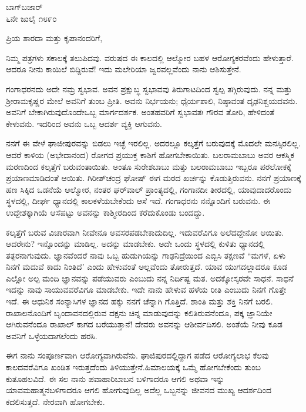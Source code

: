 \vspace{-0.65cm}

\begin{flushright}
ಬಾಗ್‌ಬಜಾರ್\\ ೬ನೇ ಜುಲೈ ೧೮೯೦
\end{flushright}

\noindent
ಪ್ರಿಯ ಶಾರದಾ ಮತ್ತು ಕೃಪಾನಂದರಿಗೆ,

ನಿಮ್ಮ ಪತ್ರಗಳು ಸಕಾಲಕ್ಕೆ ತಲುಪಿದವು. ವರುಷದ ಈ ಕಾಲದಲ್ಲಿ ಆಲ್ಮೋರ ಬಹಳ ಆರೋಗ್ಯಕರವೆಂದು ಹೇಳುತ್ತಾರೆ. ಆದರೂ ನೀನು ಕಾಯಿಲೆ ಬಿದ್ದಿರುವೆ! ಇದು ಮಲೇರಿಯಾ ಜ್ವರವಲ್ಲವೆಂದು ನಾನು ಆಶಿಸುತ್ತೇನೆ.

ಗಂಗಾಧರನದು ಅದೇ ನಮ್ರ ಸ್ವಭಾವ. ಅವನ ಪ್ರಕ್ಷುಬ್ಧ ಸ್ವಭಾವವು ತಿರುಗಾಟದಿಂದ ಸ್ವಲ್ಪ ತಗ್ಗಿರುವುದು. ನನ್ನ ಮತ್ತು ಶ‍್ರೀರಾಮಕೃಷ್ಣರ ಮೇಲೆ ಅವನಿಗೆ ತುಂಬ ಪ್ರೀತಿ. ಅವನು ನಿರ್ಭಯನು; ಧೈರ್ಯಶಾಲಿ, ನಿಷ್ಠಾವಂತ ದೃಢನಿಶ್ಚಯದವನು. ಅವನಿಗೆ ಬೇಕಾಗಿರುವುದೊಂದೇ\enginline{-}ಒಬ್ಬ ಮಾರ್ಗದರ್ಶಕ. ಅಂತಹವರಿಗೆ ಸ್ವಭಾವತಃ ಗೌರವ ತೋರಿ, ಹೇಳಿದಂತೆ ಕೇಳುವನು. ಇದರಿಂದ ಅವನು ಒಬ್ಬ ಆದರ್ಶ ವ್ಯಕ್ತಿ ಆಗುವನು.

ನನಗೆ ಈ ವೇಳೆ ಘಾಜೀಪುರವನ್ನು ಬಿಡಲು ಇಚ್ಛೆ ಇರಲಿಲ್ಲ. ಅದರಲ್ಲೂ ಕಲ್ಕತ್ತೆಗೆ ಬರುವುದಕ್ಕೆ ಮೊದಲೇ ಮನಸ್ಸಿರಲಿಲ್ಲ. ಆದರೆ ಕಾಳಿಯ (ಅಭೇದಾನಂದ) ರೋಗದ ಪ್ರಯುಕ್ತ ಕಾಶಿಗೆ ಹೋಗಬೇಕಾಯಿತು. ಬಲರಾಮಬಾಬು ಅವರ ಆಕಸ್ಮಿಕ ಮರಣದಿಂದ ಕಲ್ಕತ್ತೆಗೆ ಬರುವಂತಾಯಿತು. ಅಂತೂ ಸುರೇಶಬಾಬು ಮತ್ತು ಬಲರಾಮಬಾಬು ಇಬ್ಬರೂ ಪರಲೋಕಕ್ಕೆ ಪ್ರಯಾಣಮಾಡಿದಂತೆ ಆಯಿತು. ಗಿರೀಶ್‌ಚಂದ್ರ ಘೋಷ್ ಈಗ ಮಠದ ಖರ್ಚನ್ನು ಕೊಡುತ್ತಿರುವನು. ನನಗೆ ಪ್ರಯಾಣಕ್ಕೆ ಹಣ ಸಿಕ್ಕಿದ ಒಡನೆಯೆ ಆಲ್ಮೋರ, ನಂತರ ಘರ್‌ವಾಲ್ ಪ್ರಾಂತ್ಯದಲ್ಲಿ, ಗಂಗಾನದೀ ತೀರದಲ್ಲಿ, ಯಾವುದಾದರೊಂದು ಸ್ಥಳದಲ್ಲಿ, ದೀರ್ಘ ಧ್ಯಾನದಲ್ಲಿ ಕಾಲಕಳೆಯಬೇಕೆಂದು ಆಸೆ ಇದೆ. ಗಂಗಾಧರನು ನನ್ನೊಂದಿಗೆ ಬರುವನು. ಈ ಉದ್ದೇಶಕ್ಕಾಗಿಯೆ ಆಸೆಪಟ್ಟು ಅವನನ್ನು ಕಾಶ್ಮೀರದಿಂದ ಕರೆದುಕೊಂಡು ಬಂದದ್ದು.

ಕಲ್ಕತ್ತೆಗೆ ಬರುವ ವಿಚಾರವಾಗಿ ನೀವೇನೂ ಅವಸರಪಡಬೇಕಾದುದಿಲ್ಲ. ಇದುವರೆವಿಗೂ ಅಲೆದದ್ದೇನೋ ಆಯಿತು. ಆದರೇನು? ಇನ್ನೊಂದನ್ನು ಮಾಡಿಲ್ಲ. ಅದನ್ನು ಮಾಡಬೇಕು. ಅದೇ ಒಂದು ಸ್ಥಳದಲ್ಲಿ ಕುಳಿತು ಧ್ಯಾನದಲ್ಲಿ ತತ್ಪರನಾಗುವುದು. ಜ್ಞಾನವೆಂದರೆ ನಾವು ಒಬ್ಬ ಹುಡುಗಿಯನ್ನು ಗಾಢನಿದ್ರೆಯಿಂದ ಎಬ್ಬಿಸಿ ತಕ್ಷಣವೆ ``ಮಗಳೆ, ಏಳು ನಿನಗೆ ಮದುವೆ ಕಾದು ನಿಂತಿದೆ' ಎಂದು ಹೇಳುವಂತೆ ಅಲ್ಲವೆಂದು ತೋರುತ್ತದೆ. ಯಾವ ಯುಗದಲ್ಲಾದರೂ ಕೂಡ ಎಲ್ಲೋ ಅಲ್ಪ ಮಂದಿ ಜ್ಞಾನವನ್ನು ಪಡೆಯುವರು ಎಂಬುದು ನನ್ನ ನಿರ್ದಿಷ್ಟ ಮತ. ಅದಕ್ಕೋಸ್ಕರವೇ ಸಾಧನೆ. ಸಾಧನೆ \enginline{-} ಇದನ್ನು ನಾವು ಸಾಯುವವರೆವಿಗೂ ಮಾಡಬೇಕು. ಇದೇ ನಾನು ಹೇಳುವ ಹಳೆಯ ರೀತಿ ಎಂಬುದು ನಿನಗೆ ಗೊತ್ತೇ ಇದೆ. ಈ ಆಧುನಿಕ ಸಂನ್ಯಾಸಿಗಳ ಜ್ಞಾನದ ಹಕ್ಕು ನನಗೆ ಚೆನ್ನಾಗಿ ಗೊತ್ತಿದೆ. ಶಾಂತಿ ಮತ್ತು ಶಕ್ತಿ ನಿನಗೆ ಬರಲಿ. ರಾಖಾಲನೊಂದಿಗೆ ಬೃಂದಾವನದಲ್ಲಿರುವ ದಕ್ಷನು ಚಿನ್ನ ಮಾಡುವುದನ್ನು ಕಲಿತಿರುವನೆಂದೂ, ಪಕ್ಕ ಜ್ಞಾನಿಯೇ ಆಗಿರುವನೆಂದೂ ರಾಖಾಲ್ ಕಾಗದ ಬರೆಯುತ್ತಾನೆ! ದೇವರು ಅವನನ್ನು ಆಶೀರ್ವದಿಸಲಿ. ಅಂತೆಯೆ ನೀವು ಕೂಡ ಅವನಿಗೆ ಒಳ್ಳೆಯದಾಗಲೆಂದು ಹರಸಿ.

ಈಗ ನಾನು ಸಂಪೂರ್ಣವಾಗಿ ಆರೋಗ್ಯವಾಗಿರುವೆನು. ಘಾಜಿಪುರದಲ್ಲಿದ್ದಾಗ ಪಡೆದ ಆರೋಗ್ಯಲಾಭ ಕೆಲವು ಕಾಲದವರೆವಿಗೂ ಖಂಡಿತ ಇರುತ್ತದೆಂದು ತಿಳಿಯುತ್ತೇನೆ.\break ಹಿಮಾಲಯಕ್ಕೆ ಒಮ್ಮೆ ಹೋಗಬೇಕೆಂದು ತುಂಬ ಕುತೂಹಲವಿದೆ. ಈ ಸಲ ನಾನು ಪವಾಹಾರಿಬಾಬನ ಬಳಿಗಾದರೂ ಆಗಲಿ ಅಥವಾ ಇನ್ನು ಯಾವಮಹಾತ್ಮನಬಳಿಗಾದರೂ ಆಗಲಿ ಹೋಗುವುದಿಲ್ಲ \enginline{-} ಅದೆಲ್ಲ ಒಬ್ಬನನ್ನು ಜೀವನದ ಮುಖ್ಯ ಆದರ್ಶದಿಂದ ಕದಲಿಸು\break ತ್ತದೆ. ನೇರವಾಗಿ ಹೋಗಬೇಕು.

